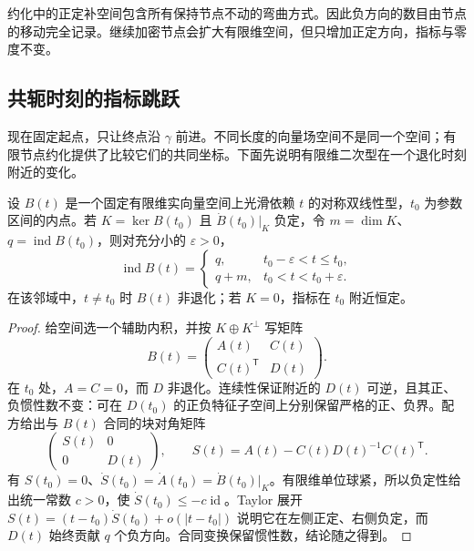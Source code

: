 约化中的正定补空间包含所有保持节点不动的弯曲方式。因此负方向的数目由节点的移动完全记录。继续加密节点会扩大有限维空间，但只增加正定方向，指标与零度不变。

\subsection{共轭时刻的指标跳跃}
\label{g3:subsec:0604:02}

现在固定起点，只让终点沿 \(\gamma\) 前进。不同长度的向量场空间不是同一个空间；有限节点约化提供了比较它们的共同坐标。下面先说明有限维二次型在一个退化时刻附近的变化。

\begin{lemma}\label{g3:lem:negative-crossing-inertia}
	设 \(B(t)\) 是一个固定有限维实向量空间上光滑依赖 \(t\) 的对称双线性型，\(t_0\) 为参数区间的内点。若 \(K=\ker B(t_0)\) 且 \(\dot B(t_0)|_K\) 负定，令 \(m=\dim K\)、\(q=\operatorname{ind}B(t_0)\)，则对充分小的 \(\varepsilon>0\)，
	\[
		\operatorname{ind}B(t)=
		\begin{cases}
		q,&t_0-\varepsilon<t\le t_0,\\
		q+m,&t_0<t<t_0+\varepsilon.
		\end{cases}
	\]
	在该邻域中，\(t\ne t_0\) 时 \(B(t)\) 非退化；若 \(K=0\)，指标在 \(t_0\) 附近恒定。
\end{lemma}
\begin{proof}
	给空间选一个辅助内积，并按 \(K\oplus K^\perp\) 写矩阵
	\[
		B(t)=\begin{pmatrix}A(t)&C(t)\\C(t)^{\mathsf T}&D(t)\end{pmatrix}.
	\]
	在 \(t_0\) 处，\(A=C=0\)，而 \(D\) 非退化。连续性保证附近的 \(D(t)\) 可逆，且其正、负惯性数不变：可在 \(D(t_0)\) 的正负特征子空间上分别保留严格的正、负界。配方给出与 \(B(t)\) 合同的块对角矩阵
	\[
		\begin{pmatrix}S(t)&0\\0&D(t)\end{pmatrix},\qquad
		S(t)=A(t)-C(t)D(t)^{-1}C(t)^{\mathsf T}.
	\]
	有 \(S(t_0)=0\)、\(\dot S(t_0)=\dot A(t_0)=\dot B(t_0)|_K\)。有限维单位球紧，所以负定性给出统一常数 \(c>0\)，使 \(\dot S(t_0)\le-c\operatorname{id}\)。Taylor 展开
	\(S(t)=(t-t_0)\dot S(t_0)+o(|t-t_0|)\)
	说明它在左侧正定、右侧负定，而 \(D(t)\) 始终贡献 \(q\) 个负方向。合同变换保留惯性数，结论随之得到。
\end{proof}


